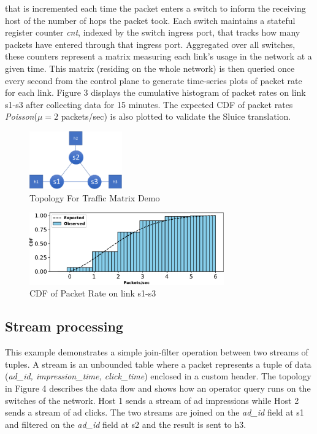 that is incremented each time the packet enters a switch to inform the
receiving host of the number of hops the packet took. Each switch maintains a
stateful register counter \textit{cnt}, indexed by the switch ingress port, that
tracks how many packets have entered through that ingress port. Aggregated over all switches, these counters represent a matrix measuring each link's
usage in the network at a given time. This matrix (residing on the whole
network) is then queried once every second from the control plane to generate
time-series plots of packet rate for each link. Figure 3 displays the cumulative histogram of packet rates on link s1-s3 after collecting data for 15 minutes. The expected CDF of packet rates \textit{Poisson}($\mu = 2$
packets/sec) is also plotted to validate the Sluice translation.

\begin{figure}[tp]
\centering
\includegraphics[width=40mm,scale=0.7]{figures/traf_mat_topo}
\vspace{-0.15in}
\caption{Topology For Traffic Matrix Demo}
\label{fig:tm}
\vspace{-0.15in}
\end{figure}

\begin{figure}[tp]
\centering
\includegraphics[width=84mm,scale=0.7]{figures/exp_obs_cdf}
\vspace{-0.15in}
\caption{CDF of Packet Rate on link s1-s3}
\vspace{-0.15in}
\end{figure}

\subsection{Stream processing}

This example demonstrates a simple join-filter operation between two streams of
tuples. A stream is an unbounded table where a packet represents a tuple of
data (\textit{ad\_id, impression\_time, click\_time}) enclosed in a custom
header. The topology in Figure 4 describes the data flow and shows how an
operator query runs on the switches of the network. Host 1 sends a stream of ad
impressions while Host 2 sends a stream of ad clicks. The two streams are
joined on the \textit{ad\_id} field at s1 and filtered on the \textit{ad\_id}
field at s2 and the result is sent to h3. 

